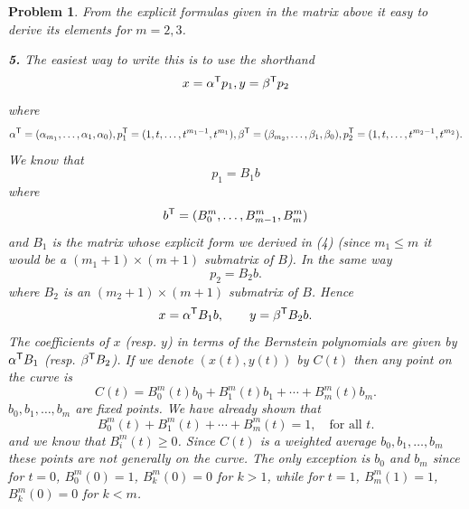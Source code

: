 \documentclass{article}
\newcommand{\subno}[1]{\par\noindent\textbf{#1}}
\theoremstyle{pprop}
\newtheorem{problem}{Problem}[section]
\begin{document}
\begin{problem}
From the explicit formulas given in the matrix above it easy to derive its elements for $m=2,3$. 
\subno{5.} The easiest way to write this is to use the shorthand 
$$
x = \alpha^{\sf T} p_{1}, y = \beta^{\sf T} p_{2}
$$
where
$$
\alpha^{\sf T}=(\alpha_{m_1},\ldots,\alpha_1,\alpha_0), \\
p_1^{\sf T}=(1,t,\ldots,t^{m_1-1},t^{m_1}),\\
\beta^{\sf T}=(\beta_{m_2},\ldots,\beta_1,\beta_0), \\
p_2^{\sf T}=(1,t,\ldots,t^{m_2-1},t^{m_2}).
$$
We know that 
$$
p_1 = B_1 b
$$
where 
$$
b^{\sf T}=(B_0^{m},\ldots,B_{m-1}^{m},B_{m}^{m})
$$
and $B_1$ is the matrix whose explicit form we derived in (4) (since $m_1\leq m$ it would be a $(m_1+1) \times (m+1)$ submatrix of $B$). In the same way
$$
p_2 = B_2 b.
$$
where $B_2$ is an $(m_2+1) \times (m+1)$ submatrix of $B$. Hence
$$
x = \alpha^{\sf T} B_1 b, \qquad  y = \beta^{\sf T} B_2 b.
$$
The coefficients of $x$ (resp. $y$) in terms of the Bernstein polynomials are given by $\alpha^{\sf T}B_1$ (resp. $\beta^{\sf T}B_2$).
If we denote $(x(t),y(t))$ by $C(t)$ then any point on the curve is
$$
C(t)=B_0^m(t)b_0 + B_1^m(t) b_1 + \cdots + B_m^m (t)b_m.
$$
$b_0,b_1,\ldots,b_m$ are fixed points. We have already shown that
$$
B_0^m(t) + B_1^m(t)  + \cdots + B_m^m(t) =1, \quad \text{for all $t$}.
$$
and we know that $B_i^m(t) \geq 0$. Since $C(t)$ is a weighted average $b_0,b_1,\ldots,b_m$ these points are not generally on the curve. 
The only exception is $b_0$ and $b_m$  since for $t=0$, $B_0^m(0)=1$, $B_k^m(0)=0$ for $k>1$, while for $t=1$, $B_m^m(1)=1$, $B_k^m(0)=0$ for $k<m$.
\end{problem}
\end{document}
